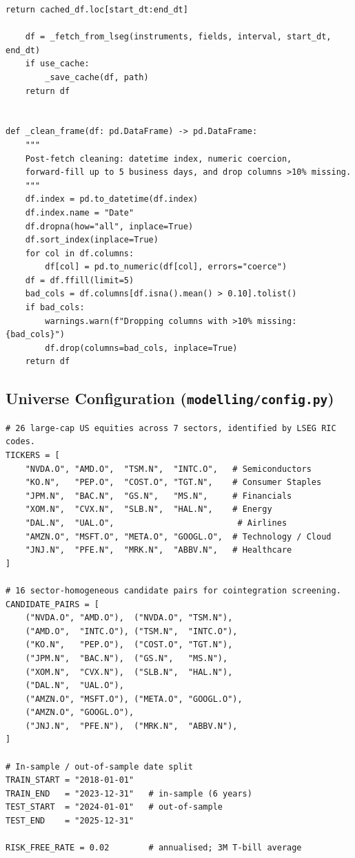 \documentclass[a4paper]{report}
\begin{document}
\begin{Verbatim}[fontsize=\footnotesize, baselinestretch=0.85]
        return cached_df.loc[start_dt:end_dt]

    df = _fetch_from_lseg(instruments, fields, interval, start_dt, end_dt)
    if use_cache:
        _save_cache(df, path)
    return df


def _clean_frame(df: pd.DataFrame) -> pd.DataFrame:
    """
    Post-fetch cleaning: datetime index, numeric coercion,
    forward-fill up to 5 business days, and drop columns >10% missing.
    """
    df.index = pd.to_datetime(df.index)
    df.index.name = "Date"
    df.dropna(how="all", inplace=True)
    df.sort_index(inplace=True)
    for col in df.columns:
        df[col] = pd.to_numeric(df[col], errors="coerce")
    df = df.ffill(limit=5)
    bad_cols = df.columns[df.isna().mean() > 0.10].tolist()
    if bad_cols:
        warnings.warn(f"Dropping columns with >10% missing: {bad_cols}")
        df.drop(columns=bad_cols, inplace=True)
    return df
\end{Verbatim}

\subsection{Universe Configuration (\texttt{modelling/config.py})}

\begin{Verbatim}[fontsize=\footnotesize, baselinestretch=0.85]
# 26 large-cap US equities across 7 sectors, identified by LSEG RIC codes.
TICKERS = [
    "NVDA.O", "AMD.O",  "TSM.N",  "INTC.O",   # Semiconductors
    "KO.N",   "PEP.O",  "COST.O", "TGT.N",    # Consumer Staples
    "JPM.N",  "BAC.N",  "GS.N",   "MS.N",     # Financials
    "XOM.N",  "CVX.N",  "SLB.N",  "HAL.N",    # Energy
    "DAL.N",  "UAL.O",                         # Airlines
    "AMZN.O", "MSFT.O", "META.O", "GOOGL.O",  # Technology / Cloud
    "JNJ.N",  "PFE.N",  "MRK.N",  "ABBV.N",   # Healthcare
]

# 16 sector-homogeneous candidate pairs for cointegration screening.
CANDIDATE_PAIRS = [
    ("NVDA.O", "AMD.O"),  ("NVDA.O", "TSM.N"),
    ("AMD.O",  "INTC.O"), ("TSM.N",  "INTC.O"),
    ("KO.N",   "PEP.O"),  ("COST.O", "TGT.N"),
    ("JPM.N",  "BAC.N"),  ("GS.N",   "MS.N"),
    ("XOM.N",  "CVX.N"),  ("SLB.N",  "HAL.N"),
    ("DAL.N",  "UAL.O"),
    ("AMZN.O", "MSFT.O"), ("META.O", "GOOGL.O"),
    ("AMZN.O", "GOOGL.O"),
    ("JNJ.N",  "PFE.N"),  ("MRK.N",  "ABBV.N"),
]

# In-sample / out-of-sample date split
TRAIN_START = "2018-01-01"
TRAIN_END   = "2023-12-31"   # in-sample (6 years)
TEST_START  = "2024-01-01"   # out-of-sample
TEST_END    = "2025-12-31"

RISK_FREE_RATE = 0.02        # annualised; 3M T-bill average
\end{Verbatim}
\end{document}
